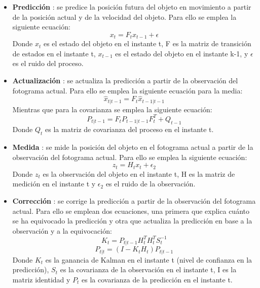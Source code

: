 \documentclass[a4paper,12pt]{article}
\begin{document}
{\begin{itemize}
  \item \textbf{Predicción} : se predice la posición futura del objeto en movimiento a partir de la posición actual y de la velocidad del objeto. Para ello se emplea la siguiente ecuación:
  \begin{equation}
    x_t = F_t x_{t-1} + \epsilon
  \end{equation}
  Donde $x_t$ es el estado del objeto en el instante t, F es la matriz de transición de estados en el instante t, $x_{t-1}$ es el estado del objeto en el instante k-1, y $\epsilon$ es el ruido del proceso.
  \item \textbf{Actualización} : se actualiza la predicción a partir de la observación del fotograma actual. Para ello se emplea la siguiente ecuación para la media:
  \begin{equation}
    \hat{x}_{t|t-1} = F_t \hat{x}_{t-1|t-1}
  \end{equation}
  Mientras que para la covarianza se emplea la siguiente ecuación:
  \begin{equation}
    P_{t|t-1} = F_t P_{t-1|t-1} F_t^T + Q_{t-1}
  \end{equation}
  Donde $Q_t$ es la matriz de covarianza del proceso en el instante t.
  \item \textbf{Medida} : se mide la posición del objeto en el fotograma actual a partir de la observación del fotograma actual. Para ello se emplea la siguiente ecuación:
  \begin{equation}
    z_t = H_t x_t + \epsilon_2
  \end{equation}
  Donde $z_t$ es la observación del objeto en el instante t, H es la matriz de medición en el instante t y $\epsilon_2$ es el ruido de la observación.
  \item \textbf{Corrección} : se corrige la predicción a partir de la observación del fotograma actual. Para ello se emplean dos ecuaciones, una primera que explica cuánto se ha equivocado la predicción y otra que actualiza la predicción en base a la observación y a la equivocación:
  \begin{equation}
    K_t = P_{t|t-1} H_t^T H_t^T S_t^{-1}
  \end{equation}
  \begin{equation}
    P_{t|t} = (I - K_t H_t) P_{t|t-1}
  \end{equation}
  Donde $K_t$ es la ganancia de Kalman en el instante t (nivel de confianza en la predicción), $S_t$ es la covarianza de la observación en el instante t, I es la matriz identidad y $P_t$ es la covarianza de la predicción en el instante t.
\end{itemize}

}
\end{document}
